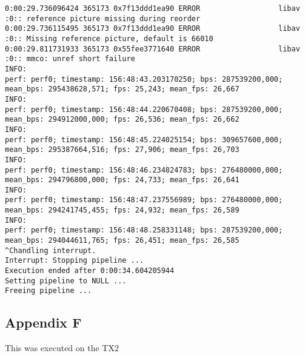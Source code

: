 \documentclass[12pt,oneside]{book}
\begin{document}
\begin{lstlisting}
0:00:29.736096424 365173 0x7f13ddd1ea90 ERROR                  libav :0:: reference picture missing during reorder
0:00:29.736115495 365173 0x7f13ddd1ea90 ERROR                  libav :0:: Missing reference picture, default is 66010
0:00:29.811731933 365173 0x55fee3771640 ERROR                  libav :0:: mmco: unref short failure
INFO:
perf: perf0; timestamp: 156:48:43.203170250; bps: 287539200,000; mean_bps: 295438628,571; fps: 25,243; mean_fps: 26,667
INFO:
perf: perf0; timestamp: 156:48:44.220670408; bps: 287539200,000; mean_bps: 294912000,000; fps: 26,536; mean_fps: 26,662
INFO:
perf: perf0; timestamp: 156:48:45.224025154; bps: 309657600,000; mean_bps: 295387664,516; fps: 27,906; mean_fps: 26,703
INFO:
perf: perf0; timestamp: 156:48:46.234824783; bps: 276480000,000; mean_bps: 294796800,000; fps: 24,733; mean_fps: 26,641
INFO:
perf: perf0; timestamp: 156:48:47.237556989; bps: 276480000,000; mean_bps: 294241745,455; fps: 24,932; mean_fps: 26,589
INFO:
perf: perf0; timestamp: 156:48:48.258331148; bps: 287539200,000; mean_bps: 294044611,765; fps: 26,451; mean_fps: 26,585
^Chandling interrupt.
Interrupt: Stopping pipeline ...
Execution ended after 0:00:34.604205944
Setting pipeline to NULL ...
Freeing pipeline ...
\end{lstlisting}

\subsection*{Appendix F}

This was executed on the TX2
\end{document}

